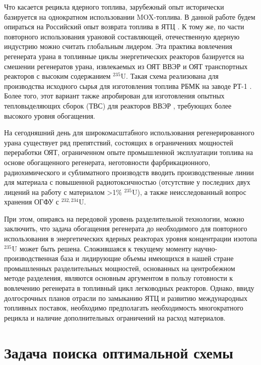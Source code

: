 Что касается рецикла ядерного топлива, зарубежный опыт исторически базируется на однократном использовании MOX-топлива.
В данной работе будем опираться на Российский опыт возврата топлива в ЯТЦ \cite{international2003iaea}.
К тому же, по части повторного использования урановой составляющей, отечественную ядерную индустрию можно считать глобальным лидером.
Эта практика вовлечения регенерата урана в топливные циклы энергетических реакторов базируется на смешении регенератов урана, извлекаемых из ОЯТ ВВЭР и ОЯТ транспортных реакторов с высоким содержанием $^{235}$U.
Такая схема реализована для производства исходного сырья для изготовления топлива РБМК на заводе РТ-1 \cite{volkVozvratUranaIz2010}.
Более того, этот вариант также апробирован для изготовления опытных тепловыделяющих сборок (ТВС) для реакторов ВВЭР \cite{proselkovAnalizVozmozhnostiIspolzovaniya2003}, требующих более высокого уровня обогащения.

На сегодняшний день для широкомасштабного использования регенерированного урана существует ряд препятствий, состоящих в ограничениях мощностей переработки ОЯТ, ограниченном опыте промышленной эксплуатации топлива на основе обогащенного регенерата, неготовности фарбрикационного, радиохимического и сублиматного производств вводить производственные линии для материала с повышенной радиотоксичностью (отсутствие у последних двух лицений на работу с материалом >1\% $^{235}$U), а также неисследованный вопрос хранения ОГФУ с $^{232,234}$U.

При этом, опираясь на передовой уровень разделительной технологии, можно заключить, что задача обогащения регенерата до необходимого для повторного использования в энергетических ядерных реакторах уровня концентрации изотопа $^{235}$U может быть решена.
Сложившаяся к текущему моменту научно-производственная база и лидирующие объемы имеющихся в нашей стране промышленных разделительных мощностей, основанных на центробежном методе разделения, являются основным аргументом в пользу готовности к вовлечению регенерата в топливный цикл легководных реакторов.
Однако, ввиду долгосрочных планов отрасли по замыканию ЯТЦ и развитию международных топливных поставок, необходимо предполагать необходимость  многократного рецикла и наличие дополнительных ограничений на расход материалов.


\section{Задача поиска оптимальной схемы}

